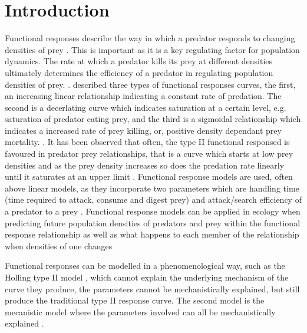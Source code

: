 \documentclass[11pt]{article}
\begin{document}
	\linenumbers
	
	\section{Introduction}
	\noindent

	
Functional responses describe the way in which a predator responds to changing densities of prey \cite{Holling1959}. This is important as it is a key regulating factor for population dynamics. The rate at which a predator kills its prey at different densities ultimately determines the efficiency of a predator in regulating population densities of prey. \cite{Murdoch1975}. \cite{Holling1959} described three types of functional responses curves, the first, an increasing linear relationship indicating a constant rate of predation. The second is a decerlating curve which indicates saturation at a certain level, e.g. saturation of predator eating prey, and the third is a sigmoidal relationship which indicates a increased rate of prey killing, or, positive density dependant prey mortality. \cite{Pervez2005}. It has been observed that often, the type II functional responsed is favoured in predator prey relationships, that is a curve which starts at low prey densities and as the prey density increases so does the predation rate linearly until it saturates at an upper limit \cite{Jeschke2002}. Functional response models are used, often above linear models, as they incorporate two parameters which are handling time (time required to attack, consume and digest prey) and attack/search efficiency of a predator to a prey \cite{Fathipour2016}. Functional response models can be applied in ecology when predicting future population densities of predators and prey within the functional response relationship as well as what happens to each member of the relationship when densities of one changes \cite{Jeschke2002}

Functional responses can be modelled in a phenomenological way, such as the Holling type II model \cite{Holling1959}, which cannot explain the underlying mechanism of the curve they produce, the parameters cannot be mechanistically explained, but still produce the traditional type II response curve. The second model is the mecanistic model where the parameters involved can all be mechanistically explained \cite{Jeschke2002}.
\end{document}
